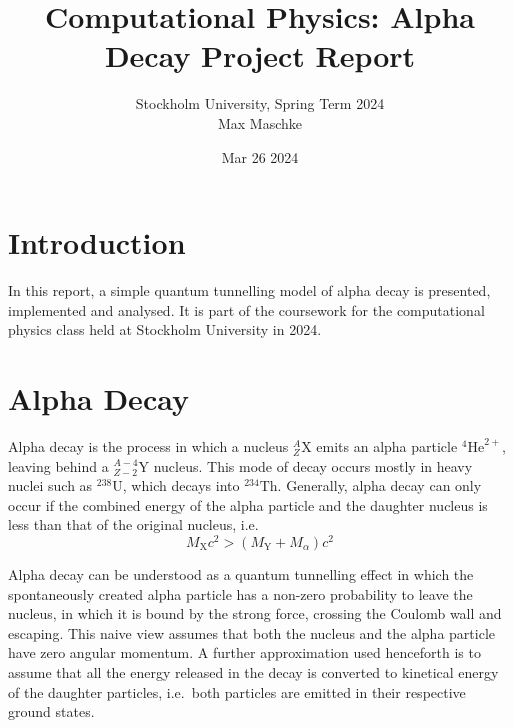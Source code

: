 \documentclass[a4paper,DIV=12,english]{scrartcl}
\title{Computational Physics: Alpha Decay Project Report}
\author{Stockholm University, Spring Term 2024 \\Max Maschke}
\date{Mar 26 2024}
\begin{document}
\maketitle


\tableofcontents
\newpage


\newpage
\section{Introduction}
In this report, a simple quantum tunnelling model of alpha decay is presented, implemented and analysed. It is part of the coursework for the computational physics class held at Stockholm University in 2024.

\section{Alpha Decay}
Alpha decay is the process in which a nucleus $^A_Z \text{X}$ emits an alpha particle $^4\text{He}^{2+}$, leaving behind a $^{A-4}_{Z-2}\text{Y}$ nucleus. This mode of decay occurs mostly in heavy nuclei such as $^{238} \text{U}$, which decays into $^{234}\text{Th}$. Generally, alpha decay can only occur if the combined energy of the alpha particle and the daughter nucleus is less than that of the original nucleus, i.e.
\begin{equation}
    M_\text{X} c^2 > (M_\text{Y} + M_\alpha)c^2
\end{equation}

Alpha decay can be understood as a quantum tunnelling effect in which the spontaneously created alpha particle has a non-zero probability to leave the nucleus, in which it is bound by the strong force, crossing the Coulomb wall and escaping. This naive view assumes that both the nucleus and the alpha particle have zero angular momentum. A further approximation used henceforth is to assume that all the energy released in the decay is converted to kinetical energy of the daughter particles, i.e.\ both particles are emitted in their respective ground states.
\end{document}

